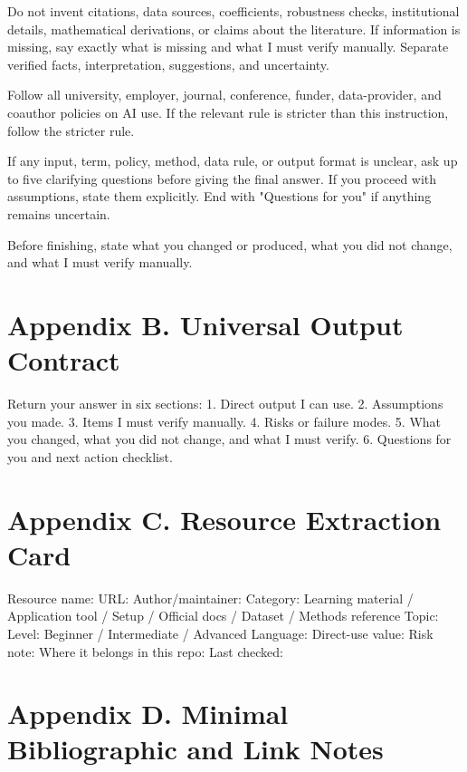 \documentclass[11pt]{article}
\begin{document}
\begin{promptblock}
Do not invent citations, data sources, coefficients, robustness checks,
institutional details, mathematical derivations, or claims about the literature.
If information is missing, say exactly what is missing and what I must verify
manually. Separate verified facts, interpretation, suggestions, and uncertainty.

Follow all university, employer, journal, conference, funder, data-provider,
and coauthor policies on AI use. If the relevant rule is stricter than this
instruction, follow the stricter rule.

If any input, term, policy, method, data rule, or output format is unclear,
ask up to five clarifying questions before giving the final answer. If you
proceed with assumptions, state them explicitly. End with "Questions for you"
if anything remains uncertain.

Before finishing, state what you changed or produced, what you did not change,
and what I must verify manually.
\end{promptblock}

\section{Appendix B. Universal Output Contract}

\begin{promptblock}
Return your answer in six sections:
1. Direct output I can use.
2. Assumptions you made.
3. Items I must verify manually.
4. Risks or failure modes.
5. What you changed, what you did not change, and what I must verify.
6. Questions for you and next action checklist.
\end{promptblock}

\section{Appendix C. Resource Extraction Card}

\begin{promptblock}
Resource name:
URL:
Author/maintainer:
Category: Learning material / Application tool / Setup / Official docs / Dataset / Methods reference
Topic:
Level: Beginner / Intermediate / Advanced
Language:
Direct-use value:
Risk note:
Where it belongs in this repo:
Last checked:
\end{promptblock}

\section{Appendix D. Minimal Bibliographic and Link Notes}
\end{document}
